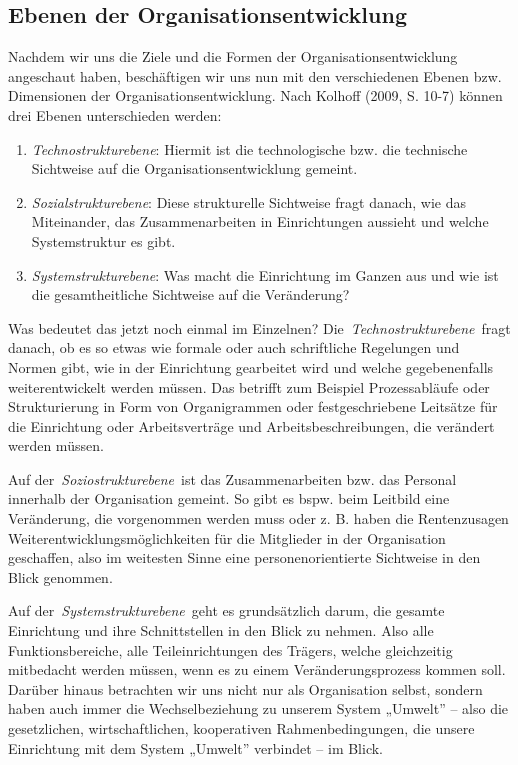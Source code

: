 \documentclass[
  letterpaper,
]{book}
\begin{document}
\subsection{Ebenen der
Organisationsentwicklung}\label{ebenen-der-organisationsentwicklung}

Nachdem wir uns die Ziele und die Formen der Organisationsentwicklung
angeschaut haben, beschäftigen wir uns nun mit den verschiedenen Ebenen
bzw. Dimensionen der Organisationsentwicklung. Nach Kolhoff (2009, S.
10-7) können drei Ebenen unterschieden werden:

\begin{enumerate}
\def\labelenumi{\arabic{enumi}.}
\item
  \emph{Technostrukturebene}: Hiermit ist die technologische bzw. die
  technische Sichtweise auf die Organisationsentwicklung gemeint.
\item
  \emph{Sozialstrukturebene}: Diese strukturelle Sichtweise fragt
  danach, wie das Miteinander, das Zusammenarbeiten in Einrichtungen
  aussieht und welche Systemstruktur es gibt.
\item
  \emph{Systemstrukturebene}: Was macht die Einrichtung im Ganzen aus
  und wie ist die gesamtheitliche Sichtweise auf die Veränderung?
\end{enumerate}

Was bedeutet das jetzt noch einmal im Einzelnen?
Die~\emph{Technostrukturebene}~fragt danach, ob es so etwas wie formale
oder auch schriftliche Regelungen und Normen gibt, wie in der
Einrichtung gearbeitet wird und welche gegebenenfalls weiterentwickelt
werden müssen. Das betrifft zum Beispiel Prozessabläufe oder
Strukturierung in Form von Organigrammen oder festgeschriebene Leitsätze
für die Einrichtung oder Arbeitsverträge und Arbeitsbeschreibungen, die
verändert werden müssen.

Auf der~\emph{Soziostrukturebene}~ist das Zusammenarbeiten bzw. das
Personal innerhalb der Organisation gemeint. So gibt es bspw. beim
Leitbild eine Veränderung, die vorgenommen werden muss oder z. B. haben
die Rentenzusagen Weiterentwicklungsmöglichkeiten für die Mitglieder in
der Organisation geschaffen, also im weitesten Sinne eine
personenorientierte Sichtweise in den Blick genommen.

Auf der~\emph{Systemstrukturebene}~geht es grundsätzlich darum, die
gesamte Einrichtung und ihre Schnittstellen in den Blick zu nehmen. Also
alle Funktionsbereiche, alle Teileinrichtungen des Trägers, welche
gleichzeitig mitbedacht werden müssen, wenn es zu einem
Veränderungsprozess kommen soll. Darüber hinaus betrachten wir uns nicht
nur als Organisation selbst, sondern haben auch immer die
Wechselbeziehung zu unserem System „Umwelt'' -- also die gesetzlichen,
wirtschaftlichen, kooperativen Rahmenbedingungen, die unsere Einrichtung
mit dem System „Umwelt'' verbindet -- im Blick.
\end{document}
